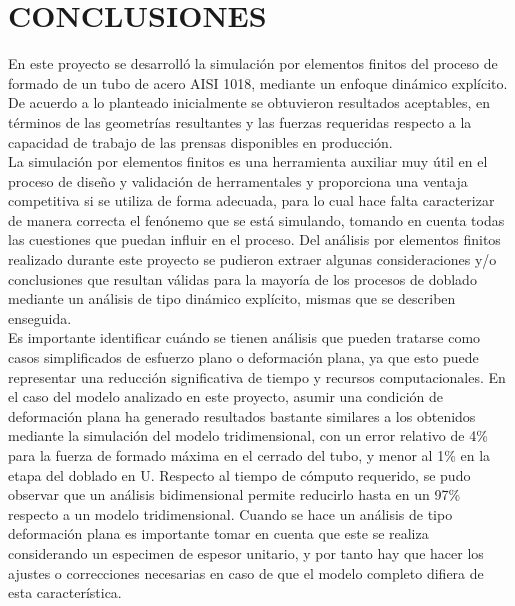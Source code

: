 \chapter*{CONCLUSIONES}


En este proyecto se desarrolló la simulación por elementos finitos del proceso de formado 
de un tubo de acero AISI 1018, mediante un enfoque dinámico explícito. De acuerdo a lo 
planteado inicialmente se obtuvieron resultados aceptables, en términos de las geometrías 
resultantes y las fuerzas requeridas respecto a la capacidad de trabajo de las prensas 
disponibles en producción.\\

La simulación por elementos finitos es una herramienta auxiliar muy útil en el proceso de 
diseño y validación de herramentales y proporciona una ventaja competitiva si se utiliza 
de forma adecuada, para lo cual hace falta caracterizar de manera correcta el fenónemo 
que se está simulando, tomando en cuenta todas las cuestiones que puedan influir 
en el proceso. Del análisis por elementos finitos realizado durante este proyecto 
se pudieron extraer algunas consideraciones y/o conclusiones que resultan válidas 
para la mayoría de los procesos de doblado mediante un análisis de tipo dinámico explícito, mismas 
que se describen enseguida.\\

Es importante identificar cuándo se tienen análisis que pueden tratarse como casos simplificados 
de esfuerzo plano o deformación plana, ya que esto puede representar una reducción significativa 
de tiempo y recursos computacionales. En el caso del modelo analizado en este proyecto, asumir 
una condición de deformación plana ha generado resultados bastante similares a los obtenidos 
mediante la simulación del modelo tridimensional, con un error relativo de 4\% para la fuerza 
de formado máxima en el cerrado del tubo, y menor al 1\% en la etapa del doblado en U. 
Respecto al tiempo de cómputo requerido, se pudo observar que un análisis bidimensional 
permite reducirlo hasta en un 97\% respecto a un modelo tridimensional.
Cuando se hace un análisis de tipo deformación plana es importante tomar en cuenta que este 
se realiza considerando un especimen de espesor unitario, y por tanto hay que hacer los ajustes 
o correcciones necesarias en caso de que el modelo completo difiera de esta característica. \\

